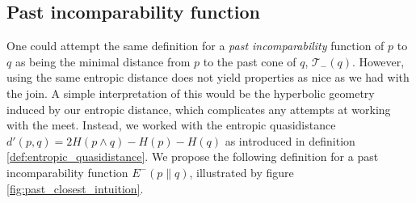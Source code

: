 \subsection{Past incomparability function}

One could attempt the same definition for a \textit{past incomparability} function of $p$ to $q$ as being the minimal distance from $p$ to the past cone of $q$, $\mathcal{T}_-(q)$. However, using the same entropic distance does not yield properties as nice as we had with the join. A simple interpretation of this would be the hyperbolic geometry induced by our entropic distance, which complicates any attempts at working with the meet. Instead, we worked with the entropic quasidistance $d'(p, q) = 2H(p \wedge q) - H(p) - H(q)$ as introduced in definition \ref{def:entropic_quasidistance}. We propose the following definition for a past incomparability function $E^-(p \parallel q)$, illustrated by figure \ref{fig:past_closest_intuition}.

